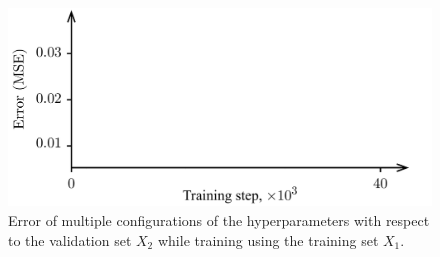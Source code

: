 \begin{figure}[t]
  \centering
  \includegraphics[width=1.0\columnwidth]{include/assets/figures/validation.pdf}
  \vspace{-1.5em}
  \caption{
    Error of multiple configurations of the hyperparameters with respect to the
    validation set $X_2$ while training using the training set $X_1$.
  }
  \vspace{-1.5em}
\end{figure}
